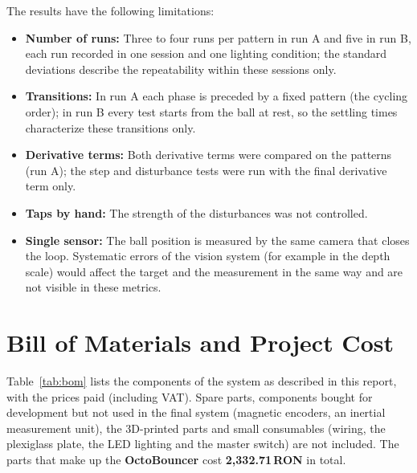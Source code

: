 \documentclass[12pt,a4paper]{report}
\begin{document}
The results have the following limitations:
\begin{itemize}
    \item \textbf{Number of runs:} Three to four runs per pattern in run A and five in run B, each run recorded in one session and one lighting condition; the standard deviations describe the repeatability within these sessions only.
    \item \textbf{Transitions:} In run A each phase is preceded by a fixed pattern (the cycling order); in run B every test starts from the ball at rest, so the settling times characterize these transitions only.
    \item \textbf{Derivative terms:} Both derivative terms were compared on the patterns (run A); the step and disturbance tests were run with the final derivative term only.
    \item \textbf{Taps by hand:} The strength of the disturbances was not controlled.
    \item \textbf{Single sensor:} The ball position is measured by the same camera that closes the loop. Systematic errors of the vision system (for example in the depth scale) would affect the target and the measurement in the same way and are not visible in these metrics.
\end{itemize}


\section{Bill of Materials and Project Cost}
\label{sec:bom}

Table~\ref{tab:bom} lists the components of the system as described in this report, with the prices paid (including VAT). Spare parts, components bought for development but not used in the final system (magnetic encoders, an inertial measurement unit), the 3D-printed parts and small consumables (wiring, the plexiglass plate, the LED lighting and the master switch) are not included. The parts that make up the \textbf{OctoBouncer} cost \textbf{2,332.71\,RON} in total.
\end{document}
